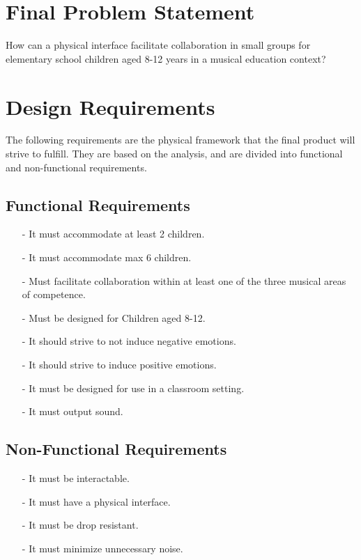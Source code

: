 
\section{Final Problem Statement}\label{sec:FPS}
	How can a physical interface facilitate collaboration in small groups for elementary school children aged 8-12 years in a musical education context?

	
\section{Design Requirements}\label{sec:DRequirements}

The following requirements are the physical framework that the final product will strive to fulfill. They are based on the analysis, and are divided into functional and non-functional requirements.
	\subsection*{Functional Requirements}
		\begin{itemize}
			\item[-] It must accommodate at least 2 children.\\
			\item[-] It must accommodate max 6 children.\\
			\item[-] Must facilitate collaboration within at least one of the three musical areas of competence.\\
			\item[-] Must be designed for Children aged 8-12.\\
			\item[-] It should strive to not induce  negative emotions.\\
			\item[-] It should strive to induce positive emotions.\\
			\item[-] It must be designed for use in a classroom setting.\\
			\item[-] It must output sound.		
			
		\end{itemize}
	\subsection*{Non-Functional Requirements}
		\begin{itemize}
			\item[-] It must be interactable.\\
			\item[-] It must have a physical interface.\\
			\item[-] It must be drop resistant.\\
			\item[-] It must minimize unnecessary noise.
		\end{itemize}
	
















		